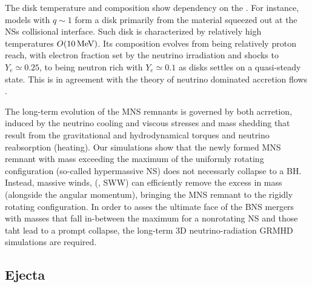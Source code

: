 The disk temperature and composition show dependency on the \mr{}. For instance, 
models with $q{\sim}1$ form a disk primarily from the material squeezed out at the 
\acp{NS} collisional interface. Such disk is characterized by relatively high 
temperatures $O(10\, {\rm MeV})$. Its composition evolves from being 
relatively proton reach, with electron fraction set by the 
neutrino irradiation and shocks to $Y_e \simeq 0.25$, to being neutron rich with 
$Y_e\simeq0.1$ as disks settles on a quasi-steady state. 
This is in agreement with the theory of neutrino dominated accretion 
flows \citep{Beloborodov:2008nx,Siegel:2017jug}. 

The long-term evolution of the \ac{MNS} remnants is governed by both acrretion, 
induced by the neutrino cooling and viscous stresses and mass shedding that result 
from the gravitational and hydrodynamical torques and neutrino reabsorption (heating).
\citep[spiral waves;][]{Radice:2018xqa}
Our simulations show that the newly formed \ac{MNS} remnant with mass exceeding the 
maximum of the uniformly rotating configuration (so-called hypermassive \ac{NS}) does 
not necessarly collapse to a \ac{BH}. Instead, massive winds, (\eg, \ac{SWW}) can 
efficiently remove the excess in mass (alongside the angular momentum), bringing 
the \ac{MNS} remnant to the rigidly rotating configuration.
In order to asses the ultimate face of the \ac{BNS} mergers with masses that fall 
in-between the maximum for a nonrotating \ac{NS} and those taht lead to a prompt collapse,
the long-term $3$D neutrino-radiation \ac{GRMHD} simulations are required.

\subsection{Ejecta}

